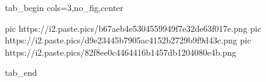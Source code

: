  
 
 
 
 


\ifcmt
  tab_begin cols=3,no_fig,center

     pic https://i2.paste.pics/b67aeb4e5304559949f7e32de63f017e.png
		 pic https://i2.paste.pics/d9e23445b7905ac4152b2729b9f9d43c.png
		 pic https://i2.paste.pics/82f8ee0c4464416b1457db1204080e4b.png

  tab_end
\fi
